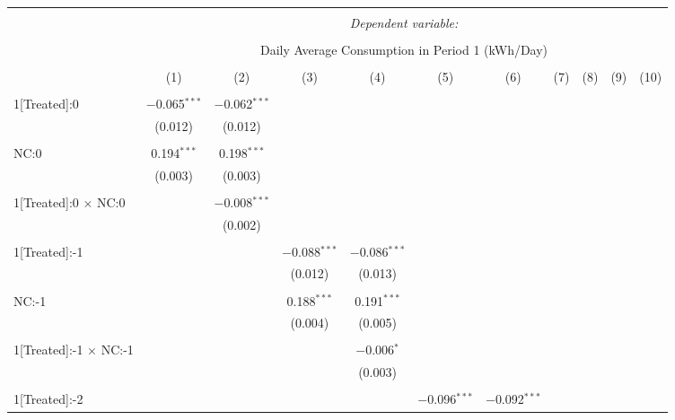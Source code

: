 
\begin{table}[!htbp] \centering 
  \caption{} 
  \label{} 
\tiny 
\begin{tabular}{@{\extracolsep{5pt}}lcccccccccc} 
\\[-1.8ex]\hline 
\hline \\[-1.8ex] 
 & \multicolumn{10}{c}{\textit{Dependent variable:}} \\ 
\cline{2-11} 
\\[-1.8ex] & \multicolumn{10}{c}{Daily Average Consumption in Period 1 (kWh/Day)} \\ 
\\[-1.8ex] & (1) & (2) & (3) & (4) & (5) & (6) & (7) & (8) & (9) & (10)\\ 
\hline \\[-1.8ex] 
 1[Treated]:0 & $-$0.065$^{***}$ & $-$0.062$^{***}$ &  &  &  &  &  &  &  &  \\ 
  & (0.012) & (0.012) &  &  &  &  &  &  &  &  \\ 
  & & & & & & & & & & \\ 
 NC:0 & 0.194$^{***}$ & 0.198$^{***}$ &  &  &  &  &  &  &  &  \\ 
  & (0.003) & (0.003) &  &  &  &  &  &  &  &  \\ 
  & & & & & & & & & & \\ 
 1[Treated]:0 $\times$ NC:0 &  & $-$0.008$^{***}$ &  &  &  &  &  &  &  &  \\ 
  &  & (0.002) &  &  &  &  &  &  &  &  \\ 
  & & & & & & & & & & \\ 
 1[Treated]:-1 &  &  & $-$0.088$^{***}$ & $-$0.086$^{***}$ &  &  &  &  &  &  \\ 
  &  &  & (0.012) & (0.013) &  &  &  &  &  &  \\ 
  & & & & & & & & & & \\ 
 NC:-1 &  &  & 0.188$^{***}$ & 0.191$^{***}$ &  &  &  &  &  &  \\ 
  &  &  & (0.004) & (0.005) &  &  &  &  &  &  \\ 
  & & & & & & & & & & \\ 
 1[Treated]:-1 $\times$ NC:-1 &  &  &  & $-$0.006$^{*}$ &  &  &  &  &  &  \\ 
  &  &  &  & (0.003) &  &  &  &  &  &  \\ 
  & & & & & & & & & & \\ 
 1[Treated]:-2 &  &  &  &  & $-$0.096$^{***}$ & $-$0.092$^{***}$ &  &  &  &  \\ 

\end{tabular}
\end{table}
